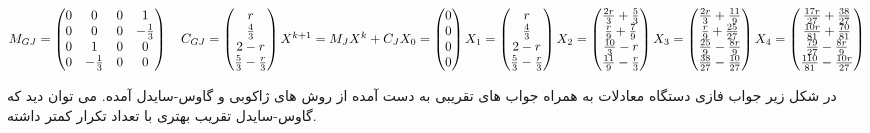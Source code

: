 	\begin{center}
		$ 
		M_{GJ} = 
		\begin{pmatrix}
		0 & 0 & 0 & 1 \\ 
		0 & 0 & 0 & -\frac{1}{3} \\ 
		0 & 1 & 0 & 0 \\ 
		0 & -\frac{1}{3} & 0 & 0 
		\end{pmatrix}
		\quad 
		C_{GJ} = 
		\begin{pmatrix}
		r \\ 
		\frac{4}{3} \\ 
		2 - r \\ 
		\frac{5}{3} - \frac{r}{3}
		\end{pmatrix} \linebreak
		X^{k+1} = M_JX^{k} + C_{J} \linebreak 
		X_0 = \begin{pmatrix} 0 \\ 0 \\ 0 \\ 0 \end{pmatrix} \linebreak 
		X_1 = 
		\begin{pmatrix}
		r \\ 
		\frac{4}{3} \\ 
		2 - r \\ 
		\frac{5}{3} - \frac{r}{3}
		\end{pmatrix} \linebreak
		X_2 = 
		\begin{pmatrix}
		\frac{2r}{3} + \frac{5}{3} \\ 
		\frac{r}{9} + \frac{7}{9}\\ 
		\frac{10}{3} - r \\ 
		\frac{11}{9} - \frac{r}{3}
		\end{pmatrix} \linebreak
		X_3 = 
		\begin{pmatrix}
		\frac{2r}{3} + \frac{11}{9} \\ 
		\frac{r}{9} + \frac{25}{27} \\ 
		\frac{25}{9} - \frac{8r}{9} \\ 
		\frac{38}{27} - \frac{10}{27}
		\end{pmatrix} \linebreak
		X_4 = 
		\begin{pmatrix}
		\frac{17r}{27} + \frac{38}{27} \\ 
		\frac{10r}{81} + \frac{70}{81}\\ 
		\frac{79}{27} - \frac{8r}{9} \\ 
		\frac{110}{81} - \frac{10r}{27}
		\end{pmatrix} \linebreak
		$
	\end{center}
	در شکل زیر جواب فازی دستگاه معادلات به همراه جواب های تقریبی به دست آمده از روش های ژاکوبی و گاوس-سایدل آمده. می توان دید که گاوس-سایدل تقریب بهتری با تعداد تکرار کمتر داشته. 
	
